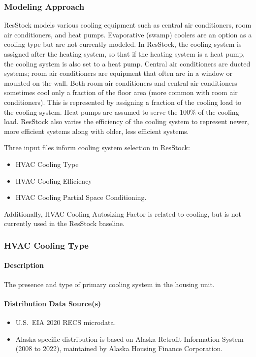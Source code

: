 \subsubsection{Modeling Approach}
ResStock models various cooling equipment such as central air conditioners, room air conditioners, and heat pumps. Evaporative (swamp) coolers are an option as a cooling type but are not currently modeled. In ResStock, the cooling system is assigned after the heating system, so that if the heating system is a heat pump, the cooling system is also set to a heat pump. Central air conditioners are ducted systems; room air conditioners are equipment that often are in a window or mounted on the wall. Both room air conditioners and central air conditioners sometimes cool only a fraction of the floor area (more common with room air conditioners). This is represented by assigning a fraction of the cooling load to the cooling system. Heat pumps are assumed to serve the 100\% of the cooling load. ResStock also varies the efficiency of the cooling system to represent newer, more efficient systems along with older, less efficient systems.

Three input files inform cooling system selection in ResStock:
\begin{itemize}
    \item HVAC Cooling Type
    \item HVAC Cooling Efficiency
    \item HVAC Cooling Partial Space Conditioning.
\end{itemize}

Additionally, HVAC Cooling Autosizing Factor is related to cooling, but is not currently used in the ResStock baseline.

\subsubsection{HVAC Cooling Type}
\paragraph{Description}
The presence and type of primary cooling system in the housing unit.

\paragraph{Distribution Data Source(s)}
\begin{itemize}
\item U.S.~EIA 2020 RECS microdata. 
\item Alaska-specific distribution is based on Alaska Retrofit Information System (2008 to 2022), maintained by Alaska Housing Finance Corporation.
\end{itemize}

